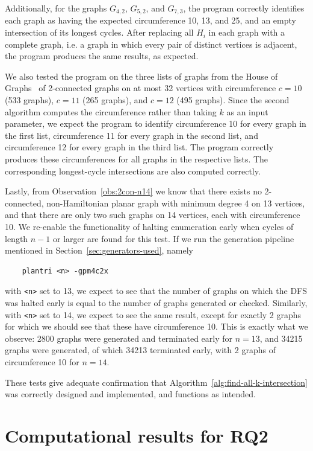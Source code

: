 Additionally, for the graphs $G_{4,2}$, $G_{5,2}$, and $G_{7,3}$, the program correctly identifies each graph as having the expected circumference 10, 13, and 25, and an empty intersection of its longest cycles. After replacing all $H_i$ in each graph with a complete graph, i.e. a graph in which every pair of distinct vertices is adjacent, the program produces the same results, as expected.

We also tested the program on the three lists of graphs from the House of Graphs~\cite{data:houseofgraphs} of 2-connected graphs on at most 32 vertices with circumference $c=10$ (533 graphs), $c=11$ (265 graphs), and $c=12$ (495 graphs). Since the second algorithm computes the circumference rather than taking $k$ as an input parameter, we expect the program to identify circumference 10 for every graph in the first list, circumference 11 for every graph in the second list, and circumference 12 for every graph in the third list. The program correctly produces these circumferences for all graphs in the respective lists. The corresponding longest-cycle intersections are also computed correctly.

Lastly, from Observation~\ref{obs:2con-n14} we know that there exists no 2-connected, non-Hamiltonian planar graph with minimum degree 4 on 13 vertices, and that there are only two such graphs on 14 vertices, each with circumference 10. We re-enable the functionality of halting enumeration early when cycles of length $n-1$ or larger are found for this test. If we run the generation pipeline mentioned in Section~\ref{sec:generators-used}, namely
\begin{verbatim}
    plantri <n> -gpm4c2x
\end{verbatim}
with \verb|<n>| set to 13, we expect to see that the number of graphs on which the DFS was halted early is equal to the number of graphs generated or checked. Similarly, with \verb|<n>| set to 14, we expect to see the same result, except for exactly 2 graphs for which we should see that these have circumference 10. This is exactly what we observe: 2800 graphs were generated and terminated early for $n=13$, and 34215 graphs were generated, of which 34213 terminated early, with 2 graphs of circumference 10 for $n=14$.

These tests give adequate confirmation that Algorithm~\ref{alg:find-all-k-intersection} was correctly designed and implemented, and functions as intended.

\section{Computational results for RQ2}

